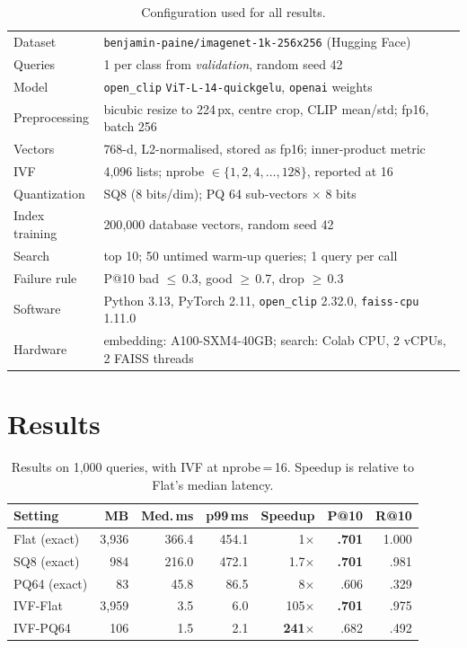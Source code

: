 \documentclass[sigconf,nonacm,pbalance]{acmart}
\begin{document}
\begin{table}[t]
\centering\footnotesize
\setlength{\tabcolsep}{3pt}
\caption{Configuration used for all results.}
\label{tab:config}
\begin{tabular}{@{}lp{}@{}}
\toprule
Dataset & \texttt{benjamin-paine/imagenet-1k-256x256} (Hugging Face) \\
Queries & 1 per class from \emph{validation}, random seed 42 \\
Model & \texttt{open\_clip} \texttt{ViT-L-14-quickgelu}, \texttt{openai} weights \\
Preprocessing & bicubic resize to 224\,px, centre crop, CLIP mean/std; fp16, batch 256 \\
Vectors & 768-d, L2-normalised, stored as fp16; inner-product metric \\
IVF & 4{,}096 lists; nprobe $\in\{1,2,4,\dots,128\}$, reported at 16 \\
Quantization & SQ8 (8 bits/dim); PQ 64 sub-vectors $\times$ 8 bits \\
Index training & 200{,}000 database vectors, random seed 42 \\
Search & top 10; 50 untimed warm-up queries; 1 query per call \\
Failure rule & P@10 bad $\le$\,0.3, good $\ge$\,0.7, drop $\ge$\,0.3 \\
Software & Python 3.13, PyTorch 2.11, \texttt{open\_clip} 2.32.0, \texttt{faiss-cpu} 1.11.0 \\
Hardware & embedding: A100-SXM4-40GB; search: Colab CPU, 2 vCPUs, 2 FAISS threads \\
\bottomrule
\end{tabular}
\end{table}

\section{Results}

\begin{table}[t]
\centering\small
\setlength{\tabcolsep}{3.2pt}
\caption{Results on 1{,}000 queries, with IVF at nprobe\,=\,16. Speedup is relative to Flat's median latency.}
\label{tab:main}
\begin{tabular}{@{}lrrrrrr@{}}
\toprule
Setting & MB & Med.\,ms & p99\,ms & Speedup & P@10 & R@10\\
\midrule
Flat (exact)  & 3{,}936 & 366.4 & 454.1 & 1$\times$   & \textbf{.701} & 1.000\\
SQ8 (exact)   &    984 & 216.0 & 472.1 & 1.7$\times$ & \textbf{.701} & .981\\
PQ64 (exact)  &     83 &  45.8 &  86.5 & 8$\times$   & .606 & .329\\
IVF-Flat      & 3{,}959 &   3.5 &   6.0 & 105$\times$ & \textbf{.701} & .975\\
IVF-PQ64      &    106 &   1.5 &   2.1 & \textbf{241$\times$} & .682 & .492\\
\bottomrule
\end{tabular}
\end{table}
\end{document}
